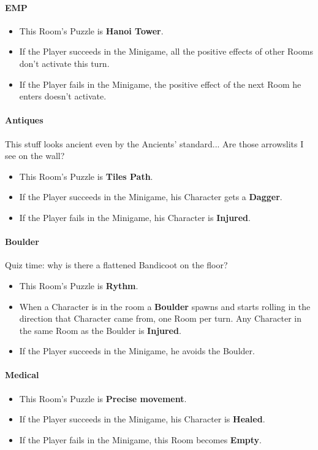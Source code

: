 \paragraph{EMP} 
\begin{itemize}
	\item This Room's Puzzle is \textbf{Hanoi Tower}.
	\item If the Player succeeds in the Minigame, all the positive effects of other Rooms don't activate this turn.
	\item If the Player fails    in the Minigame, the positive effect of the next Room he enters doesn't activate.
\end{itemize}

\paragraph{Antiques} This stuff looks ancient even by the Ancients' standard... Are those arrowslits I see on the wall?
\begin{itemize}
	\item This Room's Puzzle is \textbf{Tiles Path}.
	\item If the Player succeeds in the Minigame, his Character gets a \textbf{Dagger}.
	\item If the Player fails    in the Minigame, his Character is \textbf{Injured}.
\end{itemize}

\paragraph{Boulder} Quiz time: why is there a flattened Bandicoot on the floor?
\begin{itemize}
	\item This Room's Puzzle is \textbf{Rythm}.
	\item When a Character is in the room a \textbf{Boulder} spawns and starts rolling in the direction that Character came from, one Room per turn. Any Character in the same Room as the Boulder is \textbf{Injured}.
	\item If the Player succeeds in the Minigame, he avoids the Boulder.
\end{itemize}

\paragraph{Medical} 
\begin{itemize}
	\item This Room's Puzzle is \textbf{Precise movement}.
	\item If the Player succeeds in the Minigame, his Character is \textbf{Healed}.
	\item If the Player fails    in the Minigame, this Room becomes \textbf{Empty}.
\end{itemize}

